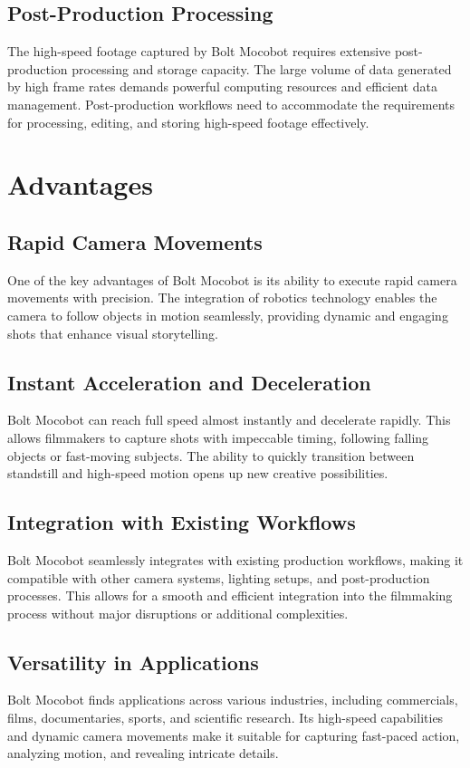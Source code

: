 \documentclass[a4paper,11pt]{report}
\begin{document}
\section{Post-Production Processing}
The high-speed footage captured by Bolt Mocobot requires extensive post-production processing and storage capacity. The large volume of data generated by high frame rates demands powerful computing resources and efficient data management. Post-production workflows need to accommodate the requirements for processing, editing, and storing high-speed footage effectively.

\chapter{Advantages}

\section{Rapid Camera Movements}
One of the key advantages of Bolt Mocobot is its ability to execute rapid camera movements with precision. The integration of robotics technology enables the camera to follow objects in motion seamlessly, providing dynamic and engaging shots that enhance visual storytelling.

\section{Instant Acceleration and Deceleration}
Bolt Mocobot can reach full speed almost instantly and decelerate rapidly. This allows filmmakers to capture shots with impeccable timing, following falling objects or fast-moving subjects. The ability to quickly transition between standstill and high-speed motion opens up new creative possibilities.

\section{Integration with Existing Workflows}
Bolt Mocobot seamlessly integrates with existing production workflows, making it compatible with other camera systems, lighting setups, and post-production processes. This allows for a smooth and efficient integration into the filmmaking process without major disruptions or additional complexities.

\section{Versatility in Applications}
Bolt Mocobot finds applications across various industries, including commercials, films, documentaries, sports, and scientific research. Its high-speed capabilities and dynamic camera movements make it suitable for capturing fast-paced action, analyzing motion, and revealing intricate details.
\end{document}
